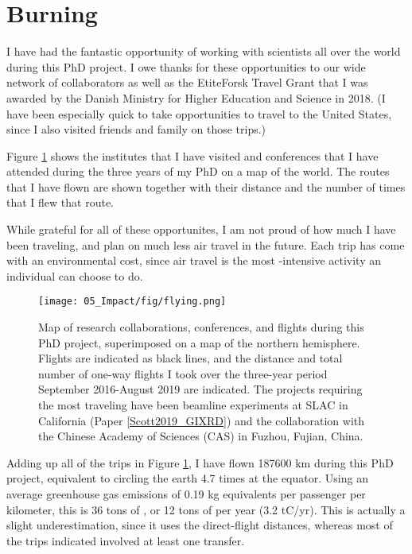 
\section{Burning}\label{sec:burning}

I have had the fantastic opportunity of working with scientists all over the world during this PhD project. I owe thanks for these opportunities to our wide network of collaborators as well as the EtiteForsk Travel Grant that I was awarded by the Danish Ministry for Higher Education and Science in 2018. (I have been especially quick to take opportunities to travel to the United States, since I also visited friends and family on those trips.)

Figure \ref{fig:flying} shows the institutes that I have visited and conferences that I have attended during the three years of my PhD on a map of the world. The routes that I have flown are shown together with their distance and the number of times that I flew that route.

While grateful for all of these opportunites, I am not proud of how much I have been traveling, and plan on much less air travel in the future. Each trip has come with an environmental cost, since air travel is the most -intensive activity an individual can choose to do.

\begin{figure}[b!]
	\texttt{[image: 05\_Impact/fig/flying.png]}
	\caption{Map of research collaborations, conferences, and flights during this PhD project, superimposed on a map of the northern hemisphere. Flights are indicated as black lines, and the distance and total number of one-way flights I took over the three-year period September 2016-August 2019 are indicated. The projects requiring the most traveling have been beamline experiments at SLAC in California (Paper \ref{Scott2019_GIXRD}) and the collaboration with the Chinese Academy of Sciences (CAS) in Fuzhou, Fujian, China.}
	\label{fig:flying}
\end{figure}

Adding up all of the trips in Figure \ref{fig:flying}, I have flown 187600 km during this PhD project, equivalent to circling the earth 4.7 times at the equator. Using an average greenhouse gas emissions of 0.19 kg  equivalents per passenger per kilometer\cite{Larsson2018}, this is 36 tons of , or 12 tons of  per year (3.2 tC/yr). This is actually a slight underestimation, since it uses the direct-flight distances, whereas most of the trips indicated involved at least one transfer.

